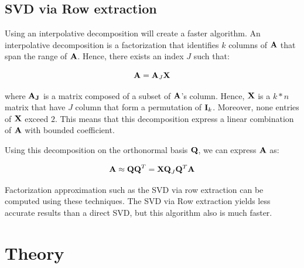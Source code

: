 \documentclass[onecolumn,12pt]{article}
\begin{document}
\noindent{}

\subsection{SVD via Row extraction}

Using an interpolative decomposition will create a faster algorithm. An
interpolative decomposition is a factorization that identifies $k$ columns of
$\bold{A}$ that span the range of $\bold{A}$. Hence, there exists an index $J$
such that:

\begin{equation}
\bold{A} = \bold{A}_J \bold{X}
\end{equation}

where $\bold{A_J}$ is a matrix composed of a subset of $\bold{A}$'s column.
Hence, $\bold{X}$ is a $k*n$ matrix that have $J$ column that form a
permutation of $\bold{I}_k$. Moreover, none entries of $\bold{X}$ exceed $2$.
This means that this decomposition express a linear combination of $\bold{A}$
with bounded coefficient.

Using this decomposition on the orthonormal basis $\bold{Q}$, we can express
$\bold{A}$ as:

\begin{equation}
\bold{A} \approx \bold{QQ}^T = \bold{XQ}_J\bold{Q}^T\bold{A}
\end{equation}

Factorization approximation such as the SVD via row extraction can be computed
using these techniques. The SVD via Row extraction yields less accurate
results than a direct SVD, but this algorithm also is much faster.

\section{Theory}
\end{document}
